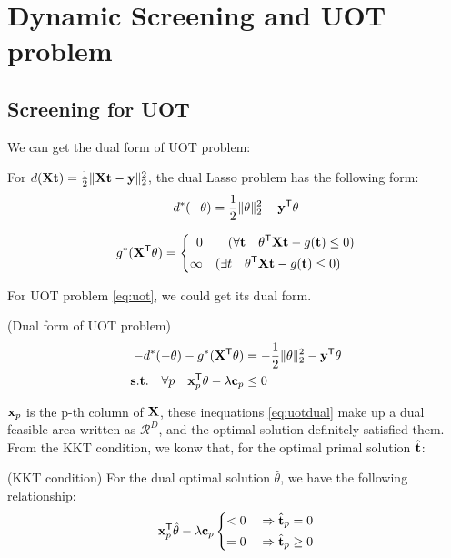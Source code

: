 \section{Dynamic Screening and UOT problem}
\subsection{Screening for UOT}

We can get the dual form of UOT problem: 
\begin{lem}
For $d(\mathbf{X} \mathbf t) = \frac{1}{2}\|\mathbf{X} \mathbf t-\mathbf y\|_2^2$, the dual Lasso problem has the following form:
$$
\begin{aligned}
d^*(-\theta) = \frac{1}{2}\|\theta\|_2^2-\mathbf y^{\mathsf T}\theta
\end{aligned}
$$

$$
g^*(\mathbf{X}^{\mathsf T}\theta) = \left\{
\begin{aligned}
0 \quad&\quad ( \forall \mathbf t \quad\theta^{\mathsf T}\mathbf{X}\mathbf t - g(\mathbf t) \leq 0 )\\
\infty \quad&( \exists t \quad\theta^{\mathsf T}\mathbf{X}\mathbf t - g(\mathbf t) \leq 0 )
\end{aligned}
\right.
$$
\end{lem}


For UOT problem \ref{eq:uot}, we could get its dual form. 
\begin{lem}(Dual form of UOT problem)
\begin{equation}
\begin{split}
-d^*(-\theta) - g^*(\mathbf{X}^{\mathsf T}\theta)& = -\frac{1}{2}\|\theta\|_2^2-\mathbf y^{\mathsf T}\theta \\
 \mathbf{s.t.} \quad \forall p  \quad \mathbf{x}_p^{\mathsf T}\theta -\lambda \mathbf c_p &\leq 0
 \end{split}
 \label{eq:uotdual}
\end{equation}
\end{lem}
$\mathbf{x}_p $ is the p-th column of $\mathbf{X}$, these inequations \ref{eq:uotdual} make up a dual feasible area written as $\mathcal{R}^{D}$, and the optimal solution definitely satisfied them.\\
From the KKT condition, we konw that, for the optimal primal solution $\hat{\mathbf t}$:
\begin{thm} (KKT condition) For the dual optimal solution $\hat{\theta}$, we have the following relationship:
 \begin{equation}
\begin{split}
\mathbf{x}_p^{\mathsf T}\hat{\theta} -\lambda \mathbf c_p  \left\{
\begin{aligned}
< 0 \quad& \Rightarrow \hat{\mathbf t}_p = 0\\
= 0 \quad& \Rightarrow \hat{\mathbf t}_p \geq 0
\end{aligned}
\right.
 \end{split}
 \label{eq:kkt}
\end{equation}
\end{thm}


